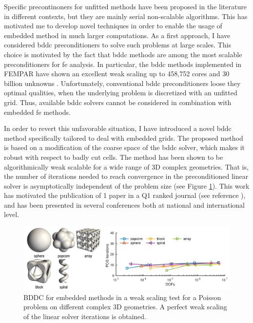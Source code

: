 \documentclass{article}
\begin{document}
Specific precontinoners for unfitted methods have been proposed in the literature in different contexts, but they are mainly serial non-scalable algorithms.  This has motivated me to develop novel techniques in order to enable the usage of embedded method in much larger computations. As a first approach, I have considered \ac{bddc} preconditioners to solve such problems at large scales. This choice is motivated by the fact that \ac{bddc} methods are among the most scalable preconditioners for \ac{fe} analysis. In particular, the \ac{bddc} methods implemented in FEMPAR  have shown an excellent weak scaling up to 458,752 cores and 30 billion unknowns \cite{badia_multilevel_2016}. Unfortunately, conventional \ac{bddc} preconditioners loose they optimal qualities, when the underlying problem is discretized with an unfitted grid. Thus, available \ac{bddc} solvers cannot be considered in combination with embedded \ac{fe} methods. 

In order to revert this unfavorable situation, {{I have introduced a novel \ac{bddc} method  specifically tailored to deal with embedded grids}}. The proposed method is based on a modification of the coarse space of the \ac{bddc} solver,  which makes it robust with respect to badly cut cells. The method has been shown to be algorithmically weak scalable for a wide range of 3D complex geometries. That is, the number of iterations needed to reach convergence in the preconditioned linear solver is asymptotically independent of the problem size (see Figure \ref{fig:fitted-vs-unfitted-bddc}). This work has motivated the {{publication of 1 paper in a Q1 ranked journal}} (see reference \cite{badia_robust_2017}), and has been presented in several conferences both at national and international level.

\begin{figure}[ht!]
\includegraphics[width=\textwidth]{../_assets/fig2.png}
\caption{BDDC for embedded methods in a weak scaling test for a Poisson problem on different complex  3D geometries. A perfect weak scaling of the linear solver iterations is obtained.}
\label{fig:fitted-vs-unfitted-bddc}
\end{figure}
\end{document}
